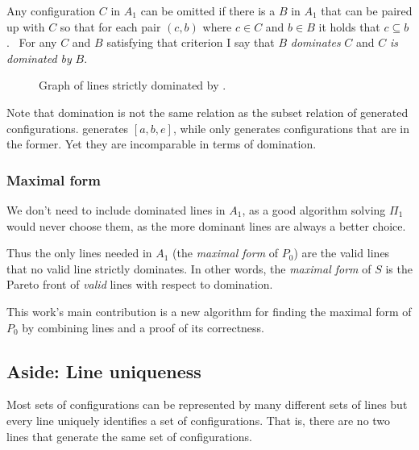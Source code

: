 \documentclass[english, 12pt, a4paper, sci, a-1b, online]{aaltothesis}
\begin{document}
Any configuration $C$ in $A_1$ can be omitted if there is a $B$ in $A_1$ that can be paired up with $C$ so that for each pair $(c, b)$ where $c \in C$ and $b \in B$ it holds that $c \subseteq b$.~\cite{DA2020} For any $C$ and $B$ satisfying that criterion I say that $B$ \emph{dominates} $C$ and $C$ \emph{is dominated by} $B$.

\begin{figure}[h]
  \centering
  \caption{Graph of lines strictly dominated by .}
\end{figure}

Note that domination is not the same relation as the subset relation of generated configurations.  generates $[a, b, e]$, while  only generates configurations that are in the former. Yet they are incomparable in terms of domination.

\subsubsection{Maximal form}

We don't need to include dominated lines in $A_1$, as a good algorithm solving $\Pi_1$ would never choose them, as the more dominant lines are always a better choice.

Thus the only lines needed in $A_1$ (the \emph{maximal form} of $P_0$) are the valid lines that no valid line strictly dominates. In other words, the \emph{maximal form} of $S$ is the Pareto front of \emph{valid} lines with respect to domination.

This work's main contribution is a new algorithm for finding the maximal form of $P_{0}$ by combining lines and a proof of its correctness.

\subsection{Aside: Line uniqueness}

Most sets of configurations can be represented by many different sets of lines but every line uniquely identifies a set of configurations. That is, there are no two lines that generate the same set of configurations.
\end{document}
